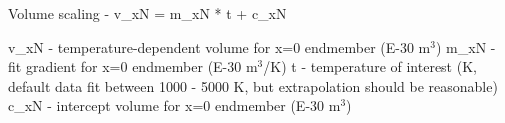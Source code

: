     Volume scaling - v\_xN = m\_xN * t + c\_xN
                     
                     v\_xN - temperature-dependent volume for x=0 endmember (E-30 m$^3$)
                     m\_xN - fit gradient for x=0 endmember (E-30 m$^3$/K)
                     t    - temperature of interest (K, default data fit between 1000 - 5000 K,
                            but extrapolation should be reasonable)
                     c\_xN - intercept volume for x=0 endmember (E-30 m$^3$)